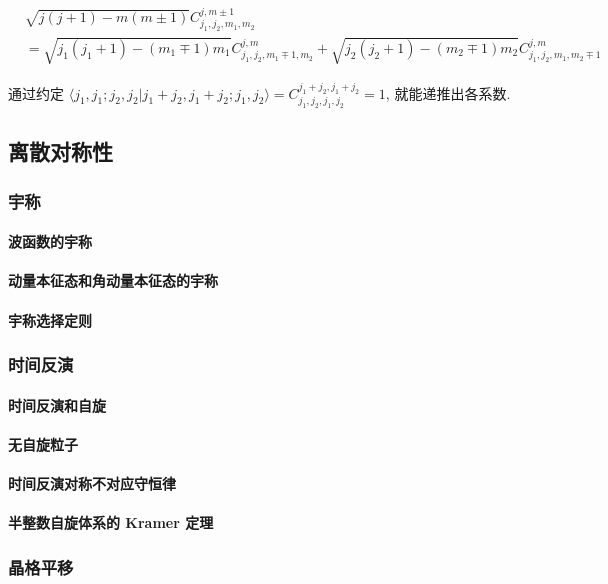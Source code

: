 \documentclass[../../main.tex]{subfiles}
\begin{document}
\begin{enumerate}
\begin{align*}
    &\sqrt{j(j+1)-m(m\pm 1)}C_{j_{1},j_{2},m_{1},m_{2}}^{j,m\pm 1} \\
    &= \sqrt{j_{1}(j_{1}+1)-(m_{1}\mp 1)m_{1}}C_{j_{1},j_{2},m_{1}\mp 1,m_{2}}^{j,m} + \sqrt{j_{2}(j_{2}+1)-(m_{2}\mp 1)m_{2}}C_{j_{1},j_{2},m_{1},m_{2}\mp 1}^{j,m}
\end{align*}

通过约定 $\langle j_{1},j_{1};j_{2},j_{2}|j_{1}+j_{2},j_{1}+j_{2};j_{1},j_{2}\rangle = C_{j_{1},j_{2},j_{1},j_{2}}^{j_{1}+j_{2},j_{1}+j_{2}} = 1$, 就能递推出各系数.

\end{enumerate}


\subsection{离散对称性}
\subsubsection{宇称}
\paragraph{波函数的宇称}
\paragraph{动量本征态和角动量本征态的宇称}
\paragraph{宇称选择定则}
\subsubsection{时间反演}
\paragraph{时间反演和自旋}
\paragraph{无自旋粒子}
\paragraph{时间反演对称不对应守恒律}
\paragraph{半整数自旋体系的 Kramer 定理}
\subsubsection{晶格平移}
\end{document}

